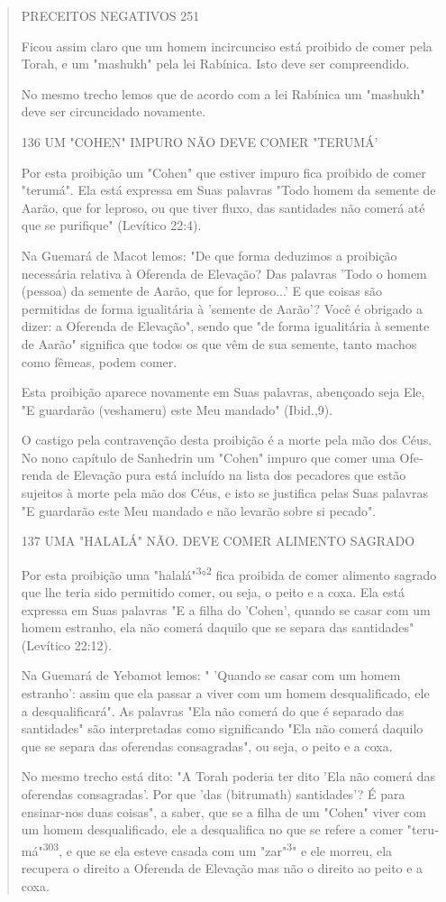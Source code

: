 \begin{quote}
PRECEITOS NEGATIVOS 251

Ficou assim claro que um homem incircunciso está proibido de co­mer pela
Torah, e um "mashukh" pela lei Rabínica. Isto deve ser compreendido.

No mesmo trecho lemos que de acordo com a lei Rabínica um "mas­hukh"
deve ser circuncidado novamente.

136 UM "COHEN" IMPURO NÃO DEVE COMER "TERUMÁ'

Por esta proibição um "Cohen" que estiver impuro fica proibido de comer
"terumá". Ela está expressa em Suas palavras "Todo homem da semen­te de
Aarão, que for leproso, ou que tiver fluxo, das santidades não comerá
até que se purifique" (Levítico 22:4).

Na Guemará de Macot lemos: "De que forma deduzimos a proibição
necessária relativa à Oferenda de Elevação? Das palavras 'Todo o homem
(pes­soa) da semente de Aarão, que for leproso...' E que coisas são
permitidas de forma igualitária à 'semente de Aarão'? Você é obrigado a
dizer: a Oferenda de Elevação", sendo que "de forma igualitária à
semente de Aarão" significa que todos os que vêm de sua semente, tanto
machos como fêmeas, podem comer.

Esta proibição aparece novamente em Suas palavras, abençoado se­ja Ele,
"E guardarão (veshameru) este Meu mandado" (Ibid.,9).

O castigo pela contravenção desta proibição é a morte pela mão dos Céus.
No nono capítulo de Sanhedrin um "Cohen" impuro que comer uma Ofe­renda
de Elevação pura está incluído na lista dos pecadores que estão sujeitos
à morte pela mão dos Céus, e isto se justifica pelas Suas palavras "E
guardarão este Meu mandado e não levarão sobre si pecado".

137 UMA "HALALÁ" NÃO. DEVE COMER ALIMENTO SAGRADO

Por esta proibição uma "halalá"\textsuperscript{3}°\textsuperscript{2}
fica proibida de comer alimento sagrado que lhe teria sido permitido
comer, ou seja, o peito e a coxa. Ela está expressa em Suas palavras "E
a filha do 'Cohen', quando se casar com um ho­mem estranho, ela não
comerá daquilo que se separa das santidades" (Levítico 22:12).

Na Guemará de Yebamot lemos: " 'Quando se casar com um homem estranho':
assim que ela passar a viver com um homem desqualificado, ele a
desqualificará". As palavras "Ela não comerá do que é separado das
santida­des" são interpretadas como significando "Ela não comerá daquilo
que se se­para das oferendas consagradas", ou seja, o peito e a coxa.

No mesmo trecho está dito: "A Torah poderia ter dito 'Ela não co­merá
das oferendas consagradas'. Por que 'das (bitrumath) santidades'? É para
ensinar-nos duas coisas", a saber, que se a filha de um "Cohen" viver
com um homem desqualificado, ele a desqualifica no que se refere a comer
"teru­má"\textsuperscript{303}, e que se ela esteve casada com um
"zar"\textsuperscript{3}" e ele morreu, ela recupera o direito a
Oferenda de Elevação mas não o direito ao peito e a coxa.
\end{quote}

